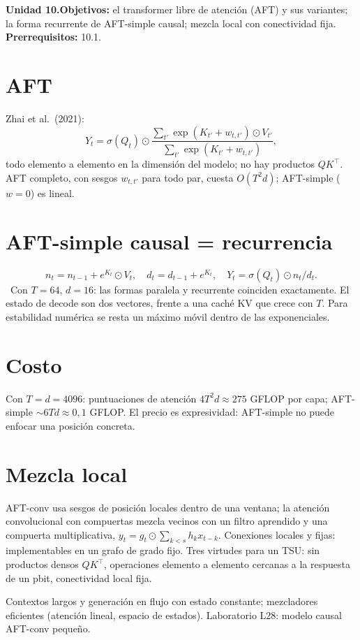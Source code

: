 \documentclass[11pt,a4paper]{article}
\begin{document}

\noindent\textbf{Unidad 10.}\quad\textbf{Objetivos:} el transformer libre de atención (AFT) y sus variantes; la forma recurrente de AFT-simple causal; mezcla local
con conectividad fija.
\textbf{Prerrequisitos:} 10.1.

\section{AFT}
Zhai et al.\ (2021):
\[Y_t=\sigma(Q_t)\odot\frac{\sum_{t'}\exp(K_{t'}+w_{t,t'})\odot V_{t'}}{\sum_{t'}\exp(K_{t'}+w_{t,t'})},\]
todo elemento a elemento en la dimensión del modelo; no hay productos $QK^\top$. AFT completo, con sesgos $w_{t,t'}$ para todo par, cuesta $O(T^2d)$; AFT-simple ($w=0$) es lineal.

\section{AFT-simple causal = recurrencia}
\[n_t=n_{t-1}+e^{K_t}\odot V_t,\quad d_t=d_{t-1}+e^{K_t},\quad Y_t=\sigma(Q_t)\odot n_t/d_t.\]
\evS\ Con $T=64$, $d=16$: las formas paralela y recurrente coinciden exactamente. El estado de decode son dos vectores, frente a una caché KV que crece con $T$.
Para estabilidad numérica se resta un máximo móvil dentro de las exponenciales.

\section{Costo \evE}
Con $T=d=4096$: puntuaciones de atención $4T^2d\approx275$ GFLOP por capa; AFT-simple $\sim6Td\approx0{,}1$ GFLOP. El precio es expresividad: AFT-simple no puede enfocar una
posición concreta.

\section{Mezcla local}
AFT-conv usa sesgos de posición locales dentro de una ventana; la atención convolucional con compuertas mezcla vecinos con un filtro aprendido y una compuerta multiplicativa,
$y_t=g_t\odot\sum_{k<s}h_kx_{t-k}$. Conexiones locales y fijas: implementables en un grafo de grado fijo. Tres virtudes para un TSU: sin productos densos $QK^\top$, operaciones
elemento a elemento cercanas a la respuesta de un pbit, conectividad local fija.

\begin{aplicacion}
Contextos largos y generación en flujo con estado constante; mezcladores eficientes (atención lineal, espacio de estados). Laboratorio L28: modelo causal AFT-conv pequeño.
\end{aplicacion}
\end{document}
